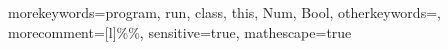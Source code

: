  {
	morekeywords={program, run, class, this, Num, Bool},
	otherkeywords={},
	morecomment=[l]{\%\%},
	sensitive=true,
	mathescape=true
}

\newcommand{\papljcode}[1]{\lstinline[language=SDF,basicstyle=\lstinlinestyle,breaklines=false]{#1}}
\newcommand{\papljcodebl}[1]{\lstinline[language=SDF,basicstyle=\lstinlinestyle,breaklines=true]{#1}}
\newcommand{\paplj}{\langname{PAPLJ}}
